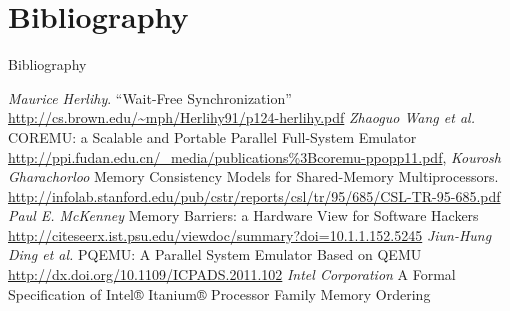 \section{Bibliography}

\begin{frame}[allowframebreaks]{Bibliography}
\begin{thebibliography}{99}
     \textit{Maurice Herlihy}. “Wait-Free Synchronization” \url{http://cs.brown.edu/~mph/Herlihy91/p124-herlihy.pdf}
     \textit{Zhaoguo Wang et al.} COREMU: a Scalable and Portable Parallel Full-System Emulator \url{http://ppi.fudan.edu.cn/_media/publications\%3Bcoremu-ppopp11.pdf},
     \textit{Kourosh Gharachorloo} Memory Consistency Models for Shared-Memory Multiprocessors. \url{http://infolab.stanford.edu/pub/cstr/reports/csl/tr/95/685/CSL-TR-95-685.pdf}
     \textit{Paul E. McKenney} Memory Barriers: a Hardware View for Software Hackers \url{http://citeseerx.ist.psu.edu/viewdoc/summary?doi=10.1.1.152.5245}
     \textit{Jiun-Hung Ding et al.} PQEMU: A Parallel System Emulator Based on QEMU \url{http://dx.doi.org/10.1109/ICPADS.2011.102}
     \textit{Intel Corporation} A Formal Specification of {Intel}® {Itanium}® Processor Family Memory Ordering
\end{thebibliography}
\end{frame}

\finalslide


